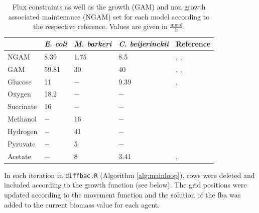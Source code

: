 \begin{table}[h!]\centering\scriptsize
\caption{Flux constraints as well as the growth (GAM) and non growth associated maintenance (NGAM) set for each model according to the respective reference. Values are given in $\frac{\mathrm{mmol}}{\mathrm{h}}$.}
\begin{tabular}{lllll}
\toprule
& \emph{E. coli} & \emph{M. barkeri} & \emph{C. beijerinckii} & Reference\\
\midrule
NGAM & 8.39 & 1.75 & 8.5 & \cite{Feist07}, \cite{Feist06}, \cite{Milne11}\\
GAM & 59.81 & 30 & 40 & \cite{Feist07}, \cite{Feist06}, \cite{Milne11}\\
Glucose & 11 & $-$ & 9.39 & \cite{Feist07}, \cite{Milne11}\\
Oxygen & 18.2 & $-$ & $-$ & \cite{Feist07}\\
Succinate & 16 & $-$ & $-$ & \cite{Orth11}\\
Methanol & $-$ & 16 & $-$ & \cite{Feist06}\\
Hydrogen & $-$ & 41 & $-$ & \cite{Feist06}\\
Pyruvate & $-$ & 5 & $-$ & \cite{Feist06}\\
Acetate & $-$ & 8 & 3.41 & \cite{Feist06}, \cite{Milne11}\\
\bottomrule 
\end{tabular} 
\label{tab:const}
\end{table}

In each iteration in \texttt{diffbac.R} (Algorithm \hyperref[alg:mainloop]{\ref{alg:mainloop}}), rows were deleted and included according to the growth function (see below). The grid positions were updated according to the movement function and the solution of the fba was added to the current biomass value for each agent.

